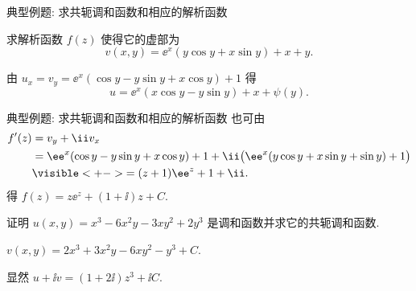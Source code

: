 \begin{frame}{典型例题: 求共轭调和函数和相应的解析函数}
	\beqskip{6pt}
	\onslide<+->
	\begin{example}[nearnext]
		求解析函数 $f(z)$ 使得它的虚部为
		\[
			v(x,y)=\ee^x(y\cos y+x\sin y)+x+y.
		\]
	\end{example}
	\onslide<+->
	\begin{solution}[nearprev]
		由 $u_x=v_y=\ee^x(\cos y-y\sin y+x\cos y)+1$ 得
		\[
			u=\ee^x(x\cos y-y\sin y)+x+\psi(y).
		\]
		\bigdel
	\end{solution}
	\endgroup
\end{frame}


\begin{frame}{典型例题: 求共轭调和函数和相应的解析函数}
	\onslide<+->
	也可由
	\begin{align*}
		f'(z)&=v_y+\ii v_x\\
		&=\ee^x(\cos y-y\sin y+x\cos y)+1
		+\ii\bigl(\ee^x(y\cos y+x\sin y+\sin y)+1\bigr)\\
		&\visible<+->{=(z+1)\ee^z+1+\ii.}
	\end{align*}
	\onslide<+->
	得 $f(z)=z\ee^z+(1+\ii)z+C$.
	\onslide<+->
	\begin{exercise}[nearnext]
		证明 $u(x,y)=x^3-6x^2y-3xy^2+2y^3$ 是调和函数并求它的共轭调和函数.
	\end{exercise}
	\onslide<+->
	\begin{answer}[nearprev]
		$v(x,y)=2x^3+3x^2y-6xy^2-y^3+C$.
	\end{answer}
	\onslide<+->
	显然 $u+\ii v=(1+2\ii)z^3+\ii C$.
\end{frame}


